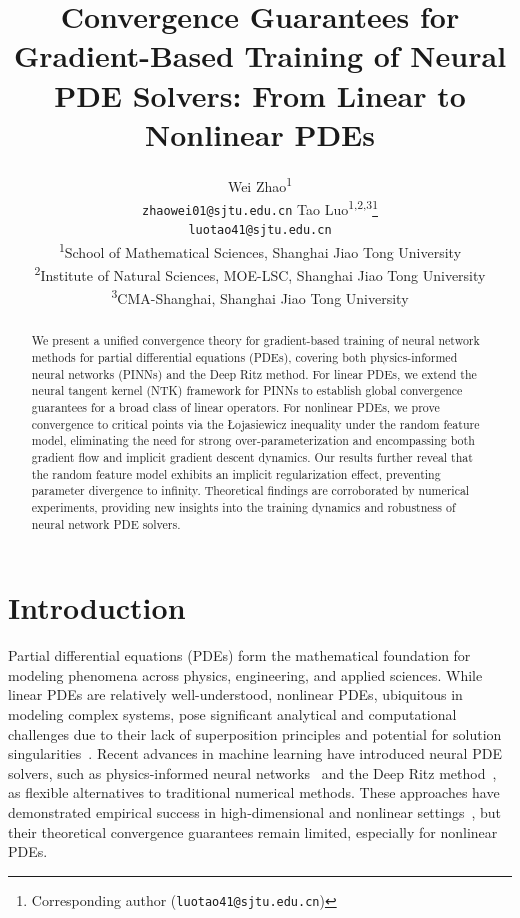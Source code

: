 \documentclass{article}
\title{Convergence Guarantees for Gradient-Based Training of Neural PDE Solvers: From Linear to Nonlinear PDEs}
\author{
Wei Zhao\textsuperscript{1} \\
\texttt{zhaowei01@sjtu.edu.cn}
\And
Tao Luo\textsuperscript{1,2,3}\thanks{Corresponding author (\texttt{luotao41@sjtu.edu.cn})} \\
\texttt{luotao41@sjtu.edu.cn}
\\[2mm]
\textsuperscript{1}School of Mathematical Sciences, Shanghai Jiao Tong University \\
\textsuperscript{2}Institute of Natural Sciences, MOE-LSC, Shanghai Jiao Tong University \\
\textsuperscript{3}CMA-Shanghai, Shanghai Jiao Tong University
}
\begin{document}
\maketitle

\begin{abstract}
We present a unified convergence theory for gradient-based training of neural network methods for partial differential equations (PDEs), covering both physics-informed neural networks (PINNs) and the Deep Ritz method. 
For linear PDEs, we extend the neural tangent kernel (NTK) framework for PINNs to establish global convergence guarantees for a broad class of linear operators. 
For nonlinear PDEs, we prove convergence to critical points via the \L{}ojasiewicz inequality under the random feature model, eliminating the need for strong over-parameterization and encompassing both gradient flow and implicit gradient descent dynamics. 
Our results further reveal that the random feature model exhibits an implicit regularization effect, preventing parameter divergence to infinity. 
Theoretical findings are corroborated by numerical experiments, providing new insights into the training dynamics and robustness of neural network PDE solvers.
\end{abstract}

\section{Introduction} \label{sec:intro}
Partial differential equations (PDEs) form the mathematical foundation for modeling phenomena across physics, engineering, and applied sciences. 
While linear PDEs are relatively well-understood, nonlinear PDEs, ubiquitous in modeling complex systems, pose significant analytical and computational challenges due to their lack of superposition principles and potential for solution singularities~\citep{evans2022partial, johnson2009numerical}.  
Recent advances in machine learning have introduced neural PDE solvers, such as physics-informed neural networks~\citep{raissi2019physics} and the Deep Ritz method~\citep{weinan2018deep}, as flexible alternatives to traditional numerical methods. 
These approaches have demonstrated empirical success in high-dimensional and nonlinear settings~\citep{lawal2022physics, karniadakis2021physics, ming2021deep,liu2023deep}, but their theoretical convergence guarantees remain limited, especially for nonlinear PDEs.  
\end{document}
